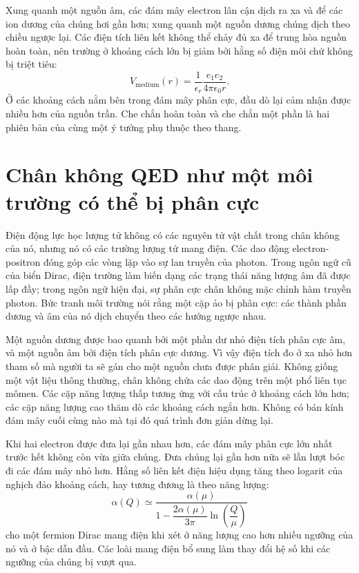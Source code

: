 Xung quanh một nguồn âm, các đám mây electron lân cận dịch ra xa và để các ion dương của chúng hơi gần hơn; xung quanh một nguồn dương chúng dịch theo chiều ngược lại. Các điện tích liên kết không thể chảy đủ xa để trung hòa nguồn hoàn toàn, nên trường ở khoảng cách lớn bị giảm bởi hằng số điện môi chứ không bị triệt tiêu:
\begin{equation}
  V_{\mathrm{medium}}(r)
  =
  \frac{1}{\epsilon_r}
  \frac{e_1e_2}{4\pi\epsilon_0r}.
  \label{eq:l10-dielectric-coulomb}
\end{equation}
Ở các khoảng cách nằm bên trong đám mây phân cực, đầu dò lại cảm nhận được nhiều hơn của nguồn trần. Che chắn hoàn toàn và che chắn một phần là hai phiên bản của cùng một ý tưởng phụ thuộc theo thang.

\section{Chân không QED như một môi trường có thể bị phân cực}

Điện động lực học lượng tử không có các nguyên tử vật chất trong chân không của nó, nhưng nó có các trường lượng tử mang điện. Các dao động electron-positron đóng góp các vòng lặp vào sự lan truyền của photon. Trong ngôn ngữ cũ của biển Dirac, điện trường làm biến dạng các trạng thái năng lượng âm đã được lấp đầy; trong ngôn ngữ hiện đại, sự phân cực chân không mặc chỉnh hàm truyền photon. Bức tranh môi trường nói rằng một cặp ảo bị phân cực: các thành phần dương và âm của nó dịch chuyển theo các hướng ngược nhau.

Một nguồn dương được bao quanh bởi một phần dư nhỏ điện tích phân cực âm, và một nguồn âm bởi điện tích phân cực dương. Vì vậy điện tích đo ở xa nhỏ hơn tham số mà người ta sẽ gán cho một nguồn chưa được phân giải. Không giống một vật liệu thông thường, chân không chứa các dao động trên một phổ liên tục mômen. Các cặp năng lượng thấp tương ứng với cấu trúc ở khoảng cách lớn hơn; các cặp năng lượng cao thăm dò các khoảng cách ngắn hơn. Không có bán kính đám mây cuối cùng nào mà tại đó quá trình đơn giản dừng lại.

Khi hai electron được đưa lại gần nhau hơn, các đám mây phân cực lớn nhất trước hết không còn vừa giữa chúng. Đưa chúng lại gần hơn nữa sẽ lần lượt bóc đi các đám mây nhỏ hơn. Hằng số liên kết điện hiệu dụng tăng theo logarit của nghịch đảo khoảng cách, hay tương đương là theo năng lượng:
\begin{equation}
  \alpha(Q)
  \simeq
  \frac{\alpha(\mu)}
  {1-\dfrac{2\alpha(\mu)}{3\pi}
  \ln\!\left(\dfrac{Q}{\mu}\right)}
  \label{eq:l10-qed-running}
\end{equation}
cho một fermion Dirac mang điện khi xét ở năng lượng cao hơn nhiều ngưỡng của nó và ở bậc dẫn đầu. Các loài mang điện bổ sung làm thay đổi hệ số khi các ngưỡng của chúng bị vượt qua.

